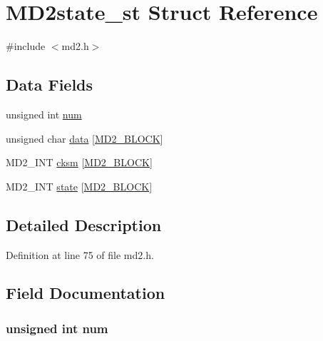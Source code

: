\hypertarget{struct_m_d2state__st}{}\section{M\+D2state\+\_\+st Struct Reference}
\label{struct_m_d2state__st}


{\ttfamily \#include $<$md2.\+h$>$}

\subsection*{Data Fields}
\begin{DoxyCompactItemize}
\item 
unsigned int \hyperlink{struct_m_d2state__st_a41ddefd3473727cad32a9767c10faed8}{num}
\item 
unsigned char \hyperlink{struct_m_d2state__st_a4e422b85a4c1ea165636ac71310124f2}{data} \mbox{[}\hyperlink{md2_8h_ae015ec44236a6c517d43faa2d47b5102}{M\+D2\+\_\+\+B\+L\+O\+CK}\mbox{]}
\item 
M\+D2\+\_\+\+I\+NT \hyperlink{struct_m_d2state__st_a3b49a88707503eeccdcce6da10e8453c}{cksm} \mbox{[}\hyperlink{md2_8h_ae015ec44236a6c517d43faa2d47b5102}{M\+D2\+\_\+\+B\+L\+O\+CK}\mbox{]}
\item 
M\+D2\+\_\+\+I\+NT \hyperlink{struct_m_d2state__st_ae94c41ba5086214cb008bd259b474985}{state} \mbox{[}\hyperlink{md2_8h_ae015ec44236a6c517d43faa2d47b5102}{M\+D2\+\_\+\+B\+L\+O\+CK}\mbox{]}
\end{DoxyCompactItemize}


\subsection{Detailed Description}


Definition at line 75 of file md2.\+h.



\subsection{Field Documentation}
\subsubsection[{\texorpdfstring{num}{num}}]{\setlength{\rightskip}{0pt plus 5cm}unsigned int num}\hypertarget{struct_m_d2state__st_a41ddefd3473727cad32a9767c10faed8}{}\label{struct_m_d2state__st_a41ddefd3473727cad32a9767c10faed8}



